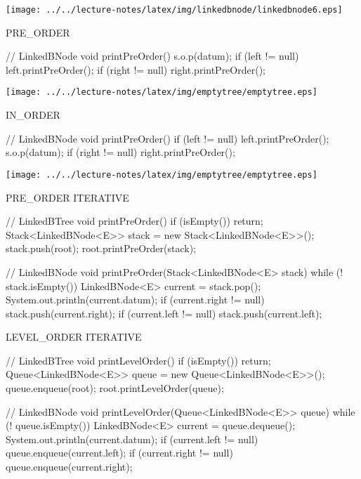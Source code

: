 \documentclass[a4paper, 10pt]{article}
\begin{document}
\begin{minipage}{0.6\linewidth}
  \begin{center}
\texttt{[image: ../../lecture-notes/latex/img/linkedbnode/linkedbnode6.eps]}
\begin{multicols}{2}
\begin{blackboard}
      PRE_ORDER

// LinkedBNode
void printPreOrder() {
  s.o.p(datum);
  if (left != null) {
    left.printPreOrder();
  }
  if (right != null) {
    right.printPreOrder();
  }
}
\end{blackboard}
\columnbreak
\texttt{[image: ../../lecture-notes/latex/img/emptytree/emptytree.eps]}
\end{multicols}
\begin{multicols}{2}
\begin{blackboard}
      IN_ORDER

// LinkedBNode
void printPreOrder() {
  if (left != null) {
    left.printPreOrder();
  }
  s.o.p(datum);
  if (right != null) {
    right.printPreOrder();
  }
}
\end{blackboard}
\columnbreak
\texttt{[image: ../../lecture-notes/latex/img/emptytree/emptytree.eps]}
\end{multicols}
\end{center}
\end{minipage}


\begin{minipage}{0.48\linewidth}
\begin{blackboard}
      PRE_ORDER ITERATIVE

// LinkedBTree
void printPreOrder() {
  if (isEmpty()) {
    return;
  }
  Stack<LinkedBNode<E>> stack =
                   new Stack<LinkedBNode<E>>();
  stack.push(root);
  root.printPreOrder(stack);
}

// LinkedBNode
void printPreOrder(Stack<LinkedBNode<E> stack) {
  while (! stack.isEmpty()) {
    LinkedBNode<E> current = stack.pop();
    System.out.println(current.datum);
    if (current.right != null) {
      stack.push(current.right);
    }
    if (current.left != null) {
      stack.push(current.left);
    }
  }
}
\end{blackboard}
\end{minipage}
\begin{minipage}{0.48\linewidth}
\begin{blackboard}
      LEVEL_ORDER ITERATIVE

// LinkedBTree
void printLevelOrder() {
  if (isEmpty()) {
    return;
  }
  Queue<LinkedBNode<E>> queue =
                   new Queue<LinkedBNode<E>>();
  queue.enqueue(root);
  root.printLevelOrder(queue);
}

// LinkedBNode
void printLevelOrder(Queue<LinkedBNode<E>> queue) {
  while (! queue.isEmpty()) {
    LinkedBNode<E> current = queue.dequeue();
    System.out.println(current.datum);
    if (current.left != null) {
      queue.enqueue(current.left);
    }
    if (current.right != null) {
      queue.enqueue(current.right);
    }
  }
}
\end{blackboard}
\end{minipage}
\end{document}
